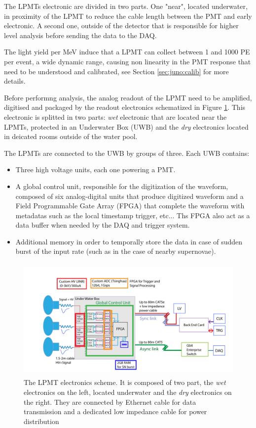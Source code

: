 \documentclass[../main.tex]{subfiles}
\begin{document}
The LPMTs electronic are divided in two parts. One "near", located underwater, in proximity of the LPMT to reduce the cable length between the PMT and early electronic. A second one, outside of the detector that is responsible for higher level analysis before sending the data to the DAQ.

The light yield per MeV induce that a LPMT can collect between 1 and 1000 PE per event, a wide dynamic range,  causing non linearity in the PMT response that need to be understood and calibrated, see Section \ref{sec:juno:calib} for more details.

Before performng analysis, the analog readout of the LPMT need to be amplified, digitised and packaged by the readout electronics schematized in Figure \ref{fig:juno:lpmt_elec}. This electronic is splitted in two parts: \textit{wet} electronic that are located near the LPMTs, protected in an Underwater Box (UWB) and the \textit{dry} electronics located in deicated rooms outside of the water pool.

The LPMTs are connected to the UWB by groups of three. Each UWB contains:
\begin{itemize}
  \item Three high voltage units, each one powering a PMT.
  \item A global control unit, responsible for the digitization of the waveform, composed of six analog-digital units that produce digitized waveform and a Field Programmable Gate Array (FPGA) that complete the waveform with metadatas such as the local timestamp trigger, etc... Ths FPGA also act as a data buffer when needed by the DAQ and trigger system.
  \item Additional memory in order to temporally store the data in case of sudden burst of the input rate (such as in the case of nearby supernovae).
\end{itemize}

\begin{figure}[ht]
  \centering
  \includegraphics[height=6cm]{images/juno/LPMT_readout.png}
  \caption{The LPMT electronics scheme. It is composed of two part, the \textit{wet} electronics on the left, located underwater and the \textit{dry} electronics on the right. They are connected by Ethernet cable for data transmission and a dedicated low impedance cable for power distribution}
  \label{fig:juno:lpmt_elec}
\end{figure}
\end{document}
